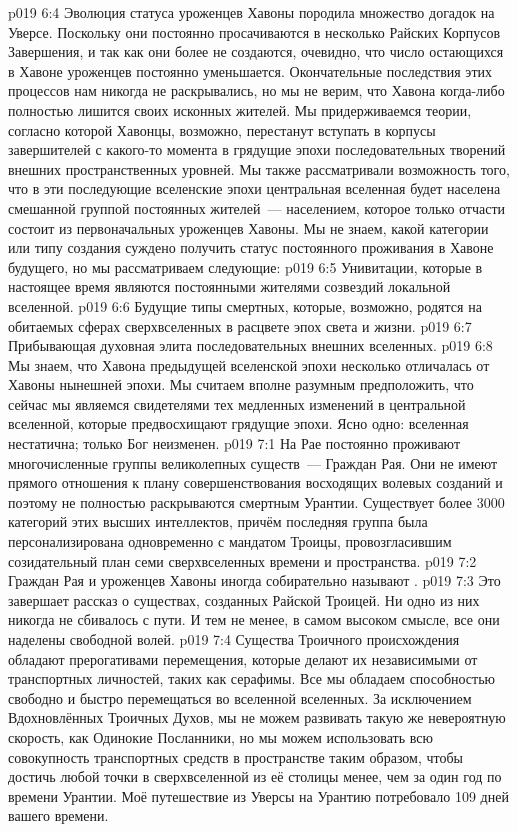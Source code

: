 \vs p019 6:4 \pc Эволюция статуса уроженцев Хавоны породила множество догадок на Уверсе. Поскольку они постоянно просачиваются в несколько Райских Корпусов Завершения, и так как они более не создаются, очевидно, что число остающихся в Хавоне уроженцев постоянно уменьшается. Окончательные последствия этих процессов нам никогда не раскрывались, но мы не верим, что Хавона когда\hyp{}либо полностью лишится своих исконных жителей. Мы придерживаемся теории, согласно которой Хавонцы, возможно, перестанут вступать в корпусы завершителей с какого\hyp{}то момента в грядущие эпохи последовательных творений внешних пространственных уровней. Мы также рассматривали возможность того, что в эти последующие вселенские эпохи центральная вселенная будет населена смешанной группой постоянных жителей~--- населением, которое только отчасти состоит из первоначальных уроженцев Хавоны. Мы не знаем, какой категории или типу создания суждено получить статус постоянного проживания в Хавоне будущего, но мы рассматриваем следующие:
\vs p019 6:5 Унивитации, которые в настоящее время являются постоянными жителями созвездий локальной вселенной.
\vs p019 6:6 Будущие типы смертных, которые, возможно, родятся на обитаемых сферах сверхвселенных в расцвете эпох света и жизни.
\vs p019 6:7 Прибывающая духовная элита последовательных внешних вселенных.
\vs p019 6:8 Мы знаем, что Хавона предыдущей вселенской эпохи несколько отличалась от Хавоны нынешней эпохи. Мы считаем вполне разумным предположить, что сейчас мы являемся свидетелями тех медленных изменений в центральной вселенной, которые предвосхищают грядущие эпохи. Ясно одно: вселенная нестатична; только Бог неизменен.
\vs p019 7:1 На Рае постоянно проживают многочисленные группы великолепных существ~--- Граждан Рая. Они не имеют прямого отношения к плану совершенствования восходящих волевых созданий и поэтому не полностью раскрываются смертным Урантии. Существует более 3000 категорий этих высших интеллектов, причём последняя группа была персонализирована одновременно с мандатом Троицы, провозгласившим созидательный план семи сверхвселенных времени и пространства.
\vs p019 7:2 \pc Граждан Рая и уроженцев Хавоны иногда собирательно называют .
\vs p019 7:3 \pc Это завершает рассказ о существах, созданных Райской Троицей. Ни одно из них никогда не сбивалось с пути. И тем не менее, в самом высоком смысле, все они наделены свободной волей.
\vs p019 7:4 Существа Троичного происхождения обладают прерогативами перемещения, которые делают их независимыми от транспортных личностей, таких как серафимы. Все мы обладаем способностью свободно и быстро перемещаться во вселенной вселенных. За исключением Вдохновлённых Троичных Духов, мы не можем развивать такую же невероятную скорость, как Одинокие Посланники, но мы можем использовать всю совокупность транспортных средств в пространстве таким образом, чтобы достичь любой точки в сверхвселенной из её столицы менее, чем за один год по времени Урантии. Моё путешествие из Уверсы на Урантию потребовало 109 дней вашего времени.

